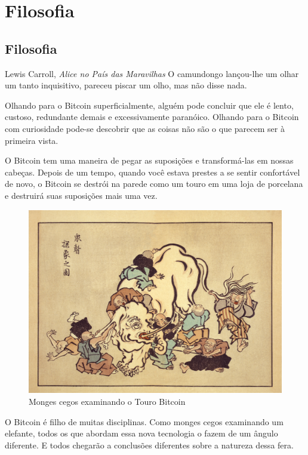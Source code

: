 \part{Filosofia}
\label{ch:philosophy}
\chapter*{Filosofia}

\begin{chapquote}{Lewis Carroll, \textit{Alice no País das Maravilhas}}
O camundongo lançou-lhe um olhar um tanto inquisitivo, pareceu piscar um olho, mas não disse nada.
\end{chapquote}

Olhando para o Bitcoin superficialmente, alguém pode concluir que ele é lento, custoso, redundante demais e excessivamente paranóico. Olhando para o Bitcoin com curiosidade pode-se descobrir que as coisas não são o que parecem ser à primeira vista.

O Bitcoin tem uma maneira de pegar as suposições e transformá-las em nossas cabeças. Depois de um tempo, quando você estava prestes a se sentir confortável de novo, o Bitcoin se destrói na parede como um touro em uma loja de porcelana e destruirá suas suposições mais uma vez.

\begin{figure}
  \includegraphics{assets/images/blind-monks.jpg}
  \caption{Monges cegos examinando o Touro Bitcoin}
  \label{fig:blind-monks}
\end{figure}

O Bitcoin é filho de muitas disciplinas. Como monges cegos examinando um elefante, todos os que abordam essa nova tecnologia o fazem de um ângulo diferente. E todos chegarão a conclusões diferentes sobre a natureza dessa fera.

